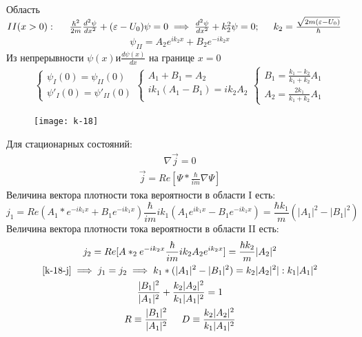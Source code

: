 \documentclass[__main__.tex]{subfiles}
\begin{document}
Область $II(x > 0): \hspace{0.5cm} \frac{\hbar^2}{2m}\frac{d^2\psi}{dx^2} + (\varepsilon - U_0)\psi = 0 \implies \frac{d^2\psi}{dx^2}+k_2^2\psi=0; \hspace{0.5cm} k_2=\frac{\sqrt{2m(\varepsilon - U_0)}}{\hbar}$
\begin{gather*}
\psi_{II} = A_2e^{ik_2x}+B_2e^{-ik_2x}
\end{gather*}
Из непрерывности $\psi(x) и \frac{d\psi(x)}{dx}$ на границе $x=0$ 
\begin{gather}
\begin{cases}
\psi_I(0) = \psi_{II}(0)\\
\psi'_I(0) = \psi'_{II}(0)
\end{cases}
\begin{cases}
A_1 + B_1 = A_2\\
ik_1(A_1 - B_1) = ik_2A_2\\
\end{cases}
\begin{cases}
\label{k-18-b1}
B_1 = \frac{k_1 - k_2}{k_1 + k_2}A_1\\
A_2 = \frac{2k_1}{k_1 + k_2}A_1
\end{cases}
\end{gather}
\begin{wrapfigure}{L}{.3\linewidth}
	\texttt{[image: k-18]}
	\caption{}
	\label{k-18}
\end{wrapfigure}
Для стационарных состояний:
\begin{gather}
\nabla\vec{j} = 0
\label{k-18-j}
\end{gather}
\begin{gather*}
\vec{j} = Re[\Psi*\frac{\hbar}{im}\nabla\Psi]
\end{gather*}
Величина вектора плотности тока вероятности в области I есть:
$$
j_1 = Re(A_1*e^{-ik_1x} + B_1e^{-ik_1x})\frac{\hbar}{im}ik_1(A_1e^{ik_1x} - B_1e^{-ik_1x}) =\frac{\hbar k_1}{m}(|A_1|^2 - |B_1|^2)
$$
Величина вектора плотности тока вероятности в области II есть:
\begin{gather*}
j_2 = Re[A*_2e^{-ik_2x}\frac{\hbar}{im}ik_2A_2e^{ik_2x}] = \frac{\hbar k_2}{m}|A_2|^2\\
\ref{k-18-j} \implies j_1 = j_2 \implies k_1*(|A_1|^2 - |B_1|^2) = k_2|A_2|^2 | : k_1|A_1|^2\\
\frac{|B_1|^2}{|A_1|^2} + \frac{k_2|A_2|^2}{k_1|A_1|^2} = 1\\
R \equiv \frac{|B_1|^2}{|A_1|^2} \hspace{0.5cm} D \equiv \frac{k_2|A_2|^2}{k_1|A_1|^2}\\
\end{gather*}
\end{document}
